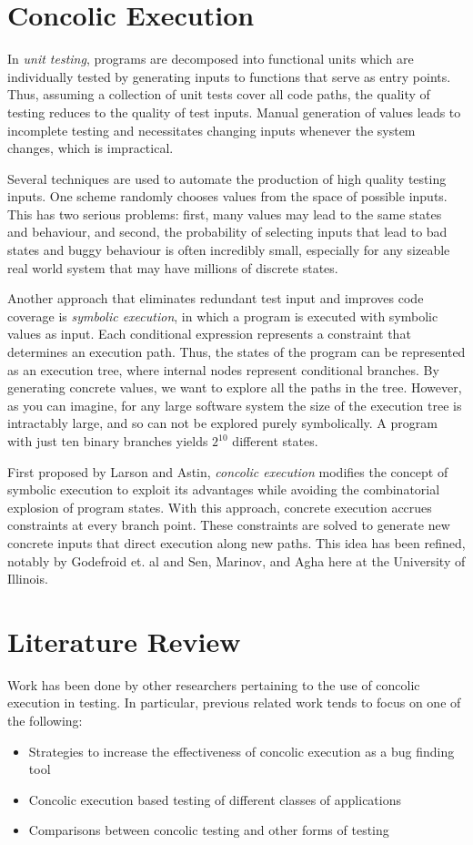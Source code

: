\documentclass[11pt]{article}
\begin{document}
\section{Concolic Execution}
In \textit{unit testing}, programs are decomposed into functional units which
are individually tested by generating inputs to functions that serve as entry
points. Thus, assuming a collection of unit tests cover all code paths, the
quality of testing reduces to the quality of test inputs. Manual generation of
values leads to incomplete testing and necessitates changing inputs whenever the
system changes, which is impractical. \par
Several techniques are used to automate
the production of high quality testing inputs. One scheme randomly chooses
values from the space of possible inputs. This has two serious problems: first,
many values may lead to the same states and behaviour, and second, the
probability of selecting inputs that lead to bad states and buggy behaviour is
often incredibly small, especially for any sizeable real world system that may
have millions of discrete states. \par
Another approach that eliminates redundant
test input and improves code coverage is \textit{symbolic execution}, in which a
program is executed with symbolic values as input. Each conditional expression
represents a constraint that determines an execution path. Thus, the states of
the program can be represented as an execution tree, where internal nodes
represent conditional branches. By generating concrete values, we want to
explore all the paths in the tree. However, as you can imagine, for any large
software system the size of the execution tree is intractably large, and so can
not be explored purely symbolically. A program with just ten binary branches
yields $2^{10}$ different states. \par
First proposed by Larson and Astin, \textit{concolic execution} modifies the concept of symbolic execution to
exploit its advantages while avoiding the combinatorial explosion of program
states. With this approach, concrete execution accrues constraints at every
branch point. These constraints are solved to generate new concrete inputs that
direct execution along new paths. This idea has been refined, notably by
Godefroid et. al and Sen, Marinov, and Agha here at the University of Illinois. 

\section{Literature Review}
Work has been done by other researchers pertaining to the use of concolic
execution in testing. In particular, previous related work
tends to focus on one of the following:
\begin{itemize}
\item Strategies to increase the effectiveness of concolic execution as a bug
finding tool
\item Concolic execution based testing of different classes of applications
\item Comparisons between concolic testing and other forms of testing
\end{itemize}
\end{document}
